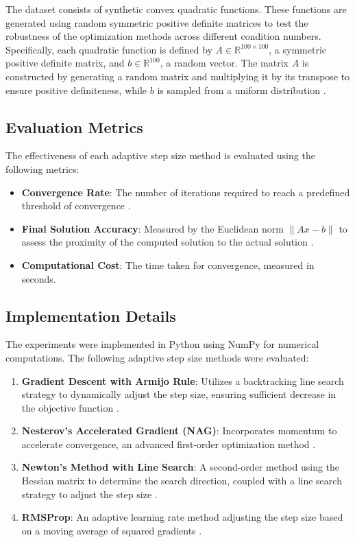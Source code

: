\documentclass[11pt]{article}
\begin{document}
The dataset consists of synthetic convex quadratic functions. These functions are generated using random symmetric positive definite matrices to test the robustness of the optimization methods across different condition numbers. Specifically, each quadratic function is defined by $A \in \mathbb{R}^{100 \times 100}$, a symmetric positive definite matrix, and $b \in \mathbb{R}^{100}$, a random vector. The matrix $A$ is constructed by generating a random matrix and multiplying it by its transpose to ensure positive definiteness, while $b$ is sampled from a uniform distribution \cite{Adeoye2024AnIS}.

\subsection{Evaluation Metrics}

The effectiveness of each adaptive step size method is evaluated using the following metrics:

\begin{itemize}

 \item \textbf{Convergence Rate}: The number of iterations required to reach a predefined threshold of convergence .
 \item \textbf{Final Solution Accuracy}: Measured by the Euclidean norm $\|Ax - b\|$ to assess the proximity of the computed solution to the actual solution \cite{Duchi2011AdaptiveSM}.
 \item \textbf{Computational Cost}: The time taken for convergence, measured in seconds.
\end{itemize}



\subsection{Implementation Details}

The experiments were implemented in Python using NumPy for numerical computations. The following adaptive step size methods were evaluated:

\begin{enumerate}

 \item \textbf{Gradient Descent with Armijo Rule}: Utilizes a backtracking line search strategy to dynamically adjust the step size, ensuring sufficient decrease in the objective function \cite{Qu2020AFA}.
 \item \textbf{Nesterov's Accelerated Gradient (NAG)}: Incorporates momentum to accelerate convergence, an advanced first-order optimization method \cite{Diakonikolas2020EfficientMF}.
 \item \textbf{Newton's Method with Line Search}: A second-order method using the Hessian matrix to determine the search direction, coupled with a line search strategy to adjust the step size .
 \item \textbf{RMSProp}: An adaptive learning rate method adjusting the step size based on a moving average of squared gradients \cite{Duchi2011AdaptiveSM}.
\end{enumerate}
\end{document}
